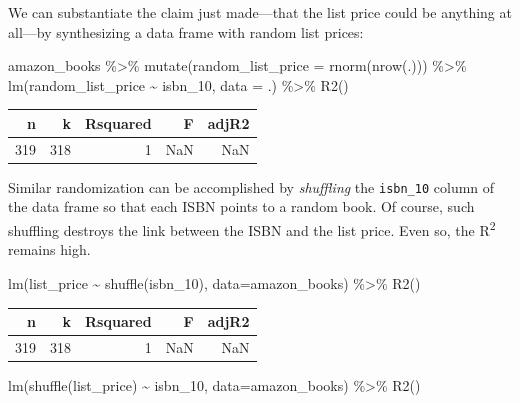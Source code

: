 \documentclass[
  letterpaper,
  DIV=11,
  numbers=noendperiod,
  oneside]{scrreprt}
\newenvironment{Shaded}{\begin{snugshade}}{\end{snugshade}}
\newcommand{\AttributeTok}[1]{\textcolor[rgb]{0.40,0.45,0.13}{#1}}
\newcommand{\FunctionTok}[1]{\textcolor[rgb]{0.28,0.35,0.67}{#1}}
\newcommand{\NormalTok}[1]{\textcolor[rgb]{0.00,0.23,0.31}{#1}}
\newcommand{\SpecialCharTok}[1]{\textcolor[rgb]{0.37,0.37,0.37}{#1}}
\begin{document}
We can substantiate the claim just made---that the list price could be
anything at all---by synthesizing a data frame with random list prices:

\begin{Shaded}
\begin{Highlighting}[]
\NormalTok{amazon\_books }\SpecialCharTok{\%\textgreater{}\%} 
  \FunctionTok{mutate}\NormalTok{(}\AttributeTok{random\_list\_price =} \FunctionTok{rnorm}\NormalTok{(}\FunctionTok{nrow}\NormalTok{(.))) }\SpecialCharTok{\%\textgreater{}\%}
  \FunctionTok{lm}\NormalTok{(random\_list\_price }\SpecialCharTok{\textasciitilde{}}\NormalTok{ isbn\_10, }\AttributeTok{data =}\NormalTok{ .) }\SpecialCharTok{\%\textgreater{}\%}
  \FunctionTok{R2}\NormalTok{()}
\end{Highlighting}
\end{Shaded}

\ttfamily 
\begin{tabular}{rrrrr}
\toprule
n & k & Rsquared & F & adjR2\\
\midrule
319 & 318 & 1 & NaN & NaN\\
\bottomrule
\end{tabular} \normalfont
\bigskip

Similar randomization can be accomplished by \emph{shuffling} the
\texttt{isbn\_10} column of the data frame so that each ISBN points to a
random book. Of course, such shuffling destroys the link between the
ISBN and the list price. Even so, the R\textsuperscript{2} remains high.

\begin{Shaded}
\begin{Highlighting}[]
\FunctionTok{lm}\NormalTok{(list\_price }\SpecialCharTok{\textasciitilde{}} \FunctionTok{shuffle}\NormalTok{(isbn\_10), }\AttributeTok{data=}\NormalTok{amazon\_books) }\SpecialCharTok{\%\textgreater{}\%} \FunctionTok{R2}\NormalTok{()}
\end{Highlighting}
\end{Shaded}

\ttfamily 
\begin{tabular}{rrrrr}
\toprule
n & k & Rsquared & F & adjR2\\
\midrule
319 & 318 & 1 & NaN & NaN\\
\bottomrule
\end{tabular} \normalfont
\bigskip

\begin{Shaded}
\begin{Highlighting}[]
\FunctionTok{lm}\NormalTok{(}\FunctionTok{shuffle}\NormalTok{(list\_price) }\SpecialCharTok{\textasciitilde{}}\NormalTok{ isbn\_10, }\AttributeTok{data=}\NormalTok{amazon\_books) }\SpecialCharTok{\%\textgreater{}\%} \FunctionTok{R2}\NormalTok{()}
\end{Highlighting}
\end{Shaded}
\end{document}

